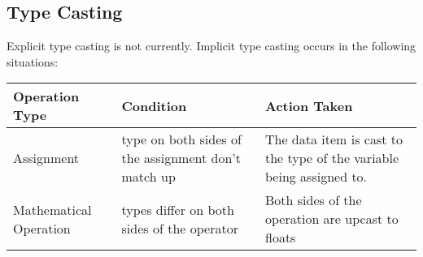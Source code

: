 \documentclass{standalone}
\begin{document}
		\subsection{Type Casting}
			Explicit type casting is not currently.
			Implicit type casting occurs in the following situations:\\
			\begin{tabular}{| l | p{5cm} | p{5cm}|}
				\hline
				Operation Type & Condition & Action Taken \\ 
				\hline
				Assignment	& type on both sides of the assignment don't match up & The data item is cast to the type of the variable being assigned to. \\ 
				\hline
				Mathematical Operation & types differ on both sides of the operator & Both sides of the operation are upcast to floats\\
				\hline
			\end{tabular}
\end{document}
